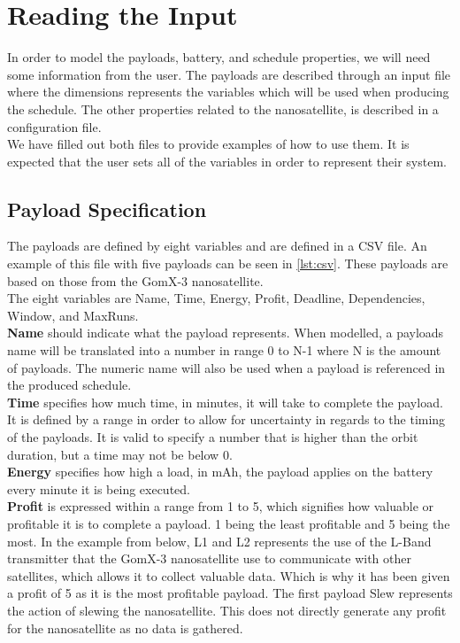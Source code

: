 \section{Reading the Input} \label{sec:read_input}
In order to model the payloads, battery, and schedule properties, we will need some information from the user.
The payloads are described through an input file where the dimensions represents the variables which will be used when producing the schedule.
The other properties related to the nanosatellite, is described in a configuration file.\\
We have filled out both files to provide examples of how to use them. It is expected that the user sets all of the variables in order to represent their system.

\subsection{Payload Specification} \label{subsec:csv}
The payloads are defined by eight variables and are defined in a CSV file. An example of this file with five payloads can be seen in \cref{lst:csv}. 
These payloads are based on those from the GomX-3 nanosatellite\cite{gomx3}.\\
The eight variables are Name, Time, Energy, Profit, Deadline, Dependencies, Window, and MaxRuns.\\
\textbf{Name} should indicate what the payload represents. When modelled, a payloads name will be translated into a number in range 0 to N-1 where N is the amount of payloads. The numeric name will also be used when a payload is referenced in the produced schedule.\\
\textbf{Time} specifies how much time, in minutes, it will take to complete the payload. It is defined by a range in order to allow for uncertainty in regards to the timing of the payloads. It is valid to specify a number that is higher than the orbit duration, but a time may not be below 0.\\
\textbf{Energy} specifies how high a load, in mAh, the payload applies on the battery every minute it is being executed.\\
\textbf{Profit} is expressed within a range from 1 to 5, which signifies how valuable or profitable it is to complete a payload. 1 being the least profitable and 5 being the most. In the example from below, L1 and L2 represents the use of the L-Band transmitter that the GomX-3 nanosatellite use to communicate with other satellites, which allows it to collect valuable data. Which is why it has been given a profit of 5 as it is the most profitable payload. The first payload Slew represents the action of slewing the nanosatellite. This does not directly generate any profit for the nanosatellite as no data is gathered.\\
